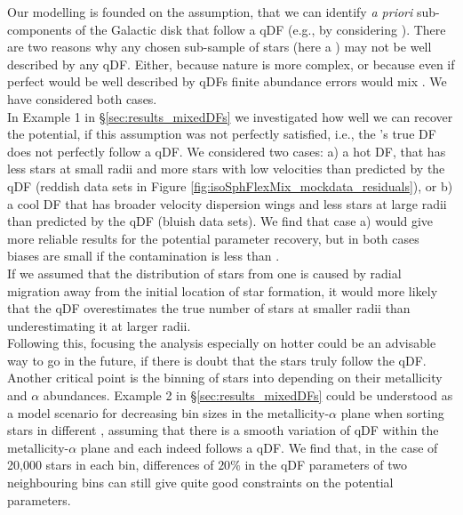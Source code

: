   Our modelling is founded on the assumption, that we can identify {\sl a priori} sub-components of the Galactic disk that follow a qDF (e.g., by considering \MAPs{}). There are two reasons why any chosen sub-sample of stars (here a \MAP{}) may not be well described by any qDF. Either, because nature is more complex, or because even if perfect
\MAPs{} would be well described by qDFs finite abundance errors would mix \MAPs{}.  We have considered both cases. 
\\In Example 1 in \S\ref{sec:results_mixedDFs} we investigated how well we can recover the potential, if this assumption was not perfectly satisfied, i.e., the \MAP{}'s true DF does not perfectly follow a qDF. We considered two cases: a) a hot DF, that has less stars at small radii and more stars with low velocities than predicted by the qDF (reddish data sets in Figure \ref{fig:isoSphFlexMix_mockdata_residuals}), or b) a cool DF that has broader velocity dispersion wings and less stars at large radii than predicted by the qDF (bluish data sets). We find that case a) would give more reliable results for the potential parameter recovery, but in both cases biases are small if the contamination is less than \Wilma{[TO DO: CHECK]}.
\\If we assumed that the distribution of stars from one \MAP{} is caused by radial migration away from the initial location of star formation, it would more likely that the qDF overestimates the true number of stars at smaller radii than underestimating it at larger radii. 
\\Following this, focusing the analysis especially on hotter \MAPs{} could be an advisable way to go in the future, if there is doubt that the stars truly follow the qDF.
\\Another critical point is the binning of stars into \MAPs{} depending on their metallicity and $\alpha$ abundances. Example 2 in \S\ref{sec:results_mixedDFs} could be understood as a model scenario for decreasing bin sizes in the metallicity-$\alpha$ plane when sorting stars in different \MAPs{}, assuming that there is a smooth variation of qDF within the metallicity-$\alpha$ plane and each \MAP{} indeed follows a qDF. We find that, in the case of 20,000 stars in each bin, differences of $20\%$ in the qDF parameters of two neighbouring bins can still give quite good constraints on the potential parameters. 
